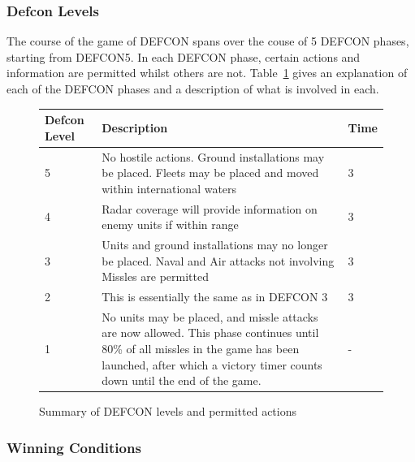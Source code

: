         \newpage
        
        \subsubsection{Defcon Levels}
        The course of the game of DEFCON spans over the couse of 5 DEFCON phases, starting from DEFCON5. In each DEFCON phase, certain actions and information are permitted whilst others are not. Table~\ref{tab:defconlevels} gives an explanation of each of the DEFCON phases and a description of what is involved in each.
             
        \begin{center}
        \begin{figure}
        \begin{center}
        \begin{tabular}{ | p{2cm} | p{7cm}| p{1.5cm} | }
        \hline
        \textbf{Defcon Level} & \textbf{Description}  & \textbf{Time} \\ \hline \hline        
        5 & No hostile actions. Ground installations may be placed. Fleets may be placed and moved within international waters & 3 \\ \hline
        4 & Radar coverage will provide information on enemy units if within range & 3 \\ \hline
        3 & Units and ground installations may no longer be placed. Naval and Air attacks not involving Missles are permitted & 3   \\ \hline
        2 & This is essentially the same as in DEFCON 3 & 3 \\ \hline
        1 & No units may be placed, and missle attacks are now allowed. This phase continues until 80\% of all missles in the game has been launched, after which a victory timer counts down until the end of the game. & -  \\ \hline
        \hline        
        \end{tabular}
        \caption{Summary of DEFCON levels and permitted actions}
        \label{tab:defconlevels}
        \end{center}
        \end{figure}
        \end{center}
        
        
        \subsubsection{Winning Conditions}

